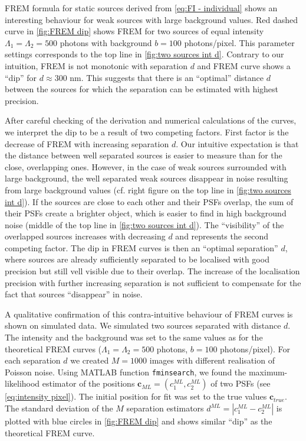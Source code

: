 FREM formula for static sources derived from \autoref{eq:FI - individual} shows an interesting behaviour for weak sources with large background values. Red dashed curve in \autoref{fig:FREM dip} shows FREM for two sources of equal intensity $\Lambda_1=\Lambda_2=500$ photons with background $b=100$ photons/pixel. This parameter settings corresponds to the top line in \autoref{fig:two sources int d}. Contrary to our intuition, FREM is not monotonic with separation $d$ and FREM curve shows a ``dip'' for $d\approx300$ nm. This suggests that there is an ``optimal'' distance $d$ between the sources for which the separation can be estimated with highest precision.

After careful checking of the derivation and numerical calculations of the curves, we interpret the dip to be a result of two competing factors. First factor is the decrease of FREM with increasing separation $d$. Our intuitive expectation is that the distance between well separated sources is easier to measure than for the close, overlapping ones. However, in the case of weak sources surrounded with large background, the well separated weak sources disappear in noise resulting from large background values (cf. right figure on the top line in \autoref{fig:two sources int d}). If the sources are close to each other and their PSFs overlap, the sum of their PSFs create a brighter object, which is easier to find in high background noise (middle of the top line in \autoref{fig:two sources int d}). The ``visibility'' of the overlapped sources increases with decreasing $d$ and represents the second competing factor. The dip in FREM curves is then an ``optimal separation'' $d$, where sources are already sufficiently separated to be localised with good precision but still vell visible due to their overlap. The increase of the localisation precision with further increasing separation is not sufficient to compensate for the fact that sources ``disappear'' in noise.

A qualitative confirmation of this contra-intuitive behaviour of FREM curves is shown on simulated data. We simulated two sources separated with distance $d$. The intensity and the background was set to the same values as for the theoretical FREM curves ($\Lambda_1=\Lambda_2=500$ photons, $b=100$ photons/pixel). For each separation $d$ we created $M=1000$ images with different realisation of Poisson noise. Using MATLAB function {\tt fminsearch}, we found the maximum-likelihood estimator of the positions $\bm{c}_{ML}=(c^{ML}_1,c^{ML}_2)$ of two PSFs (see \autoref{eq:intensity pixel}). The initial position for fit was set to the true values $\bm{c}_{true}$. The standard deviation of the $M$ separation estimators $d^{ML}=|c^{ML}_1-c^{ML}_2|$ is plotted with blue circles in \autoref{fig:FREM dip} and shows similar ``dip'' as the theoretical FREM curve.


